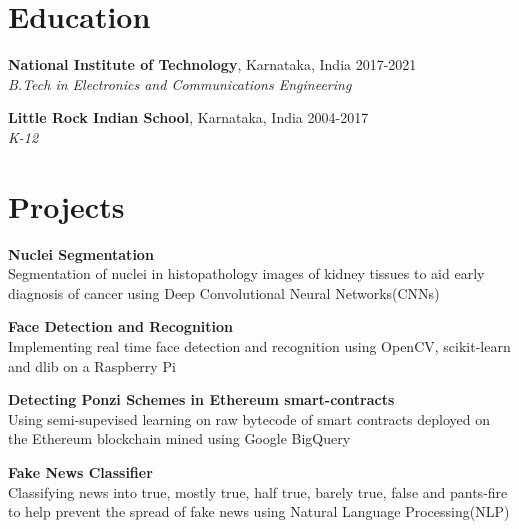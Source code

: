 \documentclass[margin]{res}
\begin{document}
  \address{National Institute of Technology\\Karnataka, India\\linkedin/in/rshwndsz}
  \address{(91+) 9611212081\\russel.171ec143@nitk.edu.in\\github.com/rshwndsz}

  \begin{resume}
    \section{Education}
      \textbf{National Institute of Technology}, Karnataka, India\hfill 
      2017-2021
      \\
      {\sl B.Tech in Electronics and Communications Engineering}\hfill 
      

      \textbf{Little Rock Indian School}, Karnataka, India\hfill
      2004-2017
      \\
      {\sl K-12}\hfill

    \section{Projects}
      \par
      \textbf{Nuclei Segmentation}\\
      Segmentation of nuclei in histopathology images of kidney tissues to aid early diagnosis of cancer using Deep Convolutional Neural Networks(CNNs)

      \par
      \textbf{Face Detection and Recognition}\\
      Implementing real time face detection and recognition using OpenCV, scikit-learn and dlib on a Raspberry Pi
      
      \par
      \textbf{Detecting Ponzi Schemes in Ethereum smart-contracts}\\
      Using semi-supevised learning on raw bytecode of smart contracts deployed on the Ethereum blockchain mined using Google BigQuery

      \par
      \textbf{Fake News Classifier}\\
      Classifying news into true, mostly true, half true, barely true, false and pants-fire to help prevent the spread of fake news using Natural Language Processing(NLP)


\end{resume}
\end{document}
